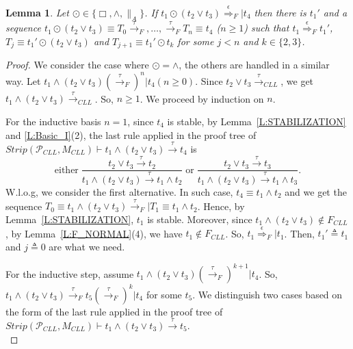 \documentclass{elsarticle}
\theoremstyle{plain}
\newtheorem{lemma}[theorem]{Lemma}
\theoremstyle{definition}
\begin{document}
\begin{lemma}\label{L:DIS}
    Let $\odot\in\{\Box,\wedge,\parallel_A\}$. If $t_1 \odot( t_2 \vee t_3) \stackrel{\epsilon}{\Longrightarrow}_F|t_4$  then there is $t_1'$ and a sequence $t_1 \odot( t_2 \vee t_3) \equiv T_0 \stackrel{\tau}{\longrightarrow}_F,\dots,\stackrel{\tau}{\longrightarrow}_F T_n \equiv t_4$ ($n\geq 1$) such that $t_1\stackrel{\epsilon}{\Longrightarrow}_F t_1'$, $T_j\equiv t_1' \odot( t_2 \vee t_3)$ and $T_{j+1}\equiv t_1' \odot t_k $ for some $j<n$ and $k\in \{2,3\}$.
\end{lemma}
\begin{proof}
   We consider the case where $\odot = \wedge$, the others are handled in a similar way.
   Let $t_1 \wedge ( t_2 \vee t_3) (\stackrel{\tau}{\longrightarrow}_F)^n|t_4(n\geq 0)$.
   Since $t_2 \vee t_3 \stackrel{\tau}{\longrightarrow}_{CLL}$, we get $t_1 \wedge ( t_2 \vee t_3) \stackrel{\tau}{\longrightarrow}_{CLL}$.
   So, $n\geq 1$. We proceed by induction on $n$.


   For the inductive basis $n=1$, since $t_4$ is stable, by Lemma~\ref{L:STABILIZATION} and \ref{L:Basic_I}(2), the last rule applied in the proof tree of $Strip({\mathcal P}_{CLL},M_{CLL}) \vdash t_1 \wedge ( t_2 \vee t_3) \stackrel{\tau}{\longrightarrow}t_4$ is
   \[\text{either}\; \frac{t_2 \vee t_3 \stackrel{\tau}{\longrightarrow}t_2}{t_1 \wedge ( t_2 \vee t_3) \stackrel{\tau}{\longrightarrow}t_1 \wedge t_2}
    \;\text{or}\; \frac{t_2 \vee t_3 \stackrel{\tau}{\longrightarrow}t_3}{t_1 \wedge ( t_2 \vee t_3) \stackrel{\tau}{\longrightarrow}t_1 \wedge t_3}.\]
   W.l.o.g, we consider the first alternative.
   In such case, $t_4 \equiv t_1\wedge t_2$ and we get the sequence $T_0 \equiv t_1 \wedge( t_2 \vee t_3) \stackrel{\tau}{\longrightarrow}_F|T_1 \equiv t_1\wedge t_2$.
   Hence, by Lemma~\ref{L:STABILIZATION}, $t_1$ is stable.
   Moreover, since $t_1 \wedge ( t_2 \vee t_3) \notin F_{CLL}$, by Lemma~\ref{L:F_NORMAL}(4), we  have $t_1 \notin F_{CLL}$.
   So, $t_1 \stackrel{\epsilon}{\Longrightarrow}_F|t_1$.  Then, $t_1' \triangleq t_1$ and $j\triangleq0$ are what we need.

   For the inductive step, assume $t_1 \wedge ( t_2 \vee t_3) (\stackrel{\tau}{\longrightarrow}_F)^{k+1}|t_4$.
   So, $t_1 \wedge ( t_2 \vee t_3)\stackrel{\tau}{\longrightarrow}_F t_5 (\stackrel{\tau}{\longrightarrow}_F)^{k}|t_4$ for some $t_5$.
   We distinguish two cases based on the form of the last rule applied in the proof tree of $Strip({\mathcal P}_{CLL},M_{CLL}) \vdash t_1 \wedge ( t_2 \vee t_3) \stackrel{\tau}{\longrightarrow}t_5$.\\


\end{proof}
\end{document}
